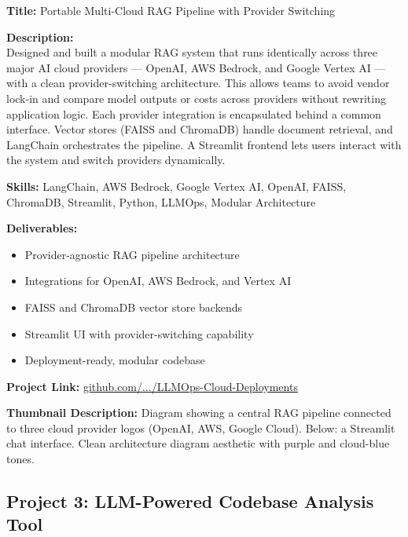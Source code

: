 \documentclass[11pt,a4paper]{article}
\newcommand{\projectentry}[1]{%
  \begin{mdframed}[backgroundcolor=LightGray, linecolor=VividPurple, linewidth=1pt,
    topline=false, bottomline=false, rightline=false,
    innerleftmargin=10pt, innerrightmargin=10pt, innertopmargin=8pt, innerbottommargin=8pt,
    skipabove=8pt, skipbelow=4pt]
  #1
  \end{mdframed}
}
\begin{document}
\projectentry{
\textbf{\textcolor{VividPurple}{Title:}} Portable Multi-Cloud RAG Pipeline with Provider Switching

\medskip
\textbf{\textcolor{VividPurple}{Description:}}\\
Designed and built a modular RAG system that runs identically across three major AI cloud providers --- OpenAI, AWS Bedrock, and Google Vertex AI --- with a clean provider-switching architecture. This allows teams to avoid vendor lock-in and compare model outputs or costs across providers without rewriting application logic. Each provider integration is encapsulated behind a common interface. Vector stores (FAISS and ChromaDB) handle document retrieval, and LangChain orchestrates the pipeline. A Streamlit frontend lets users interact with the system and switch providers dynamically.

\medskip
\textbf{\textcolor{VividPurple}{Skills:}} LangChain, AWS Bedrock, Google Vertex AI, OpenAI, FAISS, ChromaDB, Streamlit, Python, LLMOps, Modular Architecture

\medskip
\textbf{\textcolor{VividPurple}{Deliverables:}}
\begin{itemize}
  \item Provider-agnostic RAG pipeline architecture
  \item Integrations for OpenAI, AWS Bedrock, and Vertex AI
  \item FAISS and ChromaDB vector store backends
  \item Streamlit UI with provider-switching capability
  \item Deployment-ready, modular codebase
\end{itemize}

\textbf{\textcolor{VividPurple}{Project Link:}} \href{https://github.com/adebanjioluwatimileyin/generative-ai-portfolio/tree/main/LLMOps-Cloud-Deployments}{github.com/.../LLMOps-Cloud-Deployments}

\medskip
\textbf{\textcolor{VividPurple}{Thumbnail Description:}} Diagram showing a central RAG pipeline connected to three cloud provider logos (OpenAI, AWS, Google Cloud). Below: a Streamlit chat interface. Clean architecture diagram aesthetic with purple and cloud-blue tones.
}

\subsection{Project 3: LLM-Powered Codebase Analysis Tool}
\end{document}
